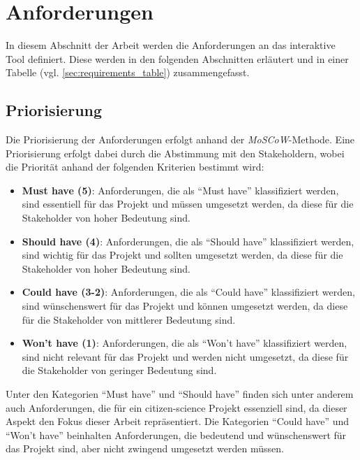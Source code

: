 \section{Anforderungen}
In diesem Abschnitt der Arbeit werden die Anforderungen an das interaktive Tool definiert. Diese werden in den folgenden Abschnitten erläutert und in einer Tabelle (vgl. \ref{sec:requirements_table}) zusammengefasst.

\subsection{Priorisierung}
Die Priorisierung der Anforderungen erfolgt anhand der \textit{MoSCoW}-Methode. Eine Priorisierung erfolgt dabei durch die Abstimmung mit den Stakeholdern, wobei die Priorität anhand der folgenden Kriterien bestimmt wird:

\begin{itemize}
    \item \textbf{Must have (5)}: Anforderungen, die als \enquote{Must have} klassifiziert werden, sind essentiell für das Projekt und müssen umgesetzt werden, da diese für die Stakeholder von hoher Bedeutung sind.
    \item \textbf{Should have (4)}: Anforderungen, die als \enquote{Should have} klassifiziert werden, sind wichtig für das Projekt und sollten umgesetzt werden, da diese für die Stakeholder von hoher Bedeutung sind.
    \item \textbf{Could have (3-2)}: Anforderungen, die als \enquote{Could have} klassifiziert werden, sind wünschenswert für das Projekt und können umgesetzt werden, da diese für die Stakeholder von mittlerer Bedeutung sind.
    \item \textbf{Won't have (1)}: Anforderungen, die als \enquote{Won't have} klassifiziert werden, sind nicht relevant für das Projekt und werden nicht umgesetzt, da diese für die Stakeholder von geringer Bedeutung sind.
\end{itemize}

Unter den Kategorien \enquote{Must have} und \enquote{Should have} finden sich unter anderem auch Anforderungen, die für ein citizen-science Projekt essenziell sind, da dieser Aspekt den Fokus dieser Arbeit repräsentiert. Die Kategorien \enquote{Could have} und \enquote{Won't have} beinhalten Anforderungen, die bedeutend und wünschenswert für das Projekt sind, aber nicht zwingend umgesetzt werden müssen. 

